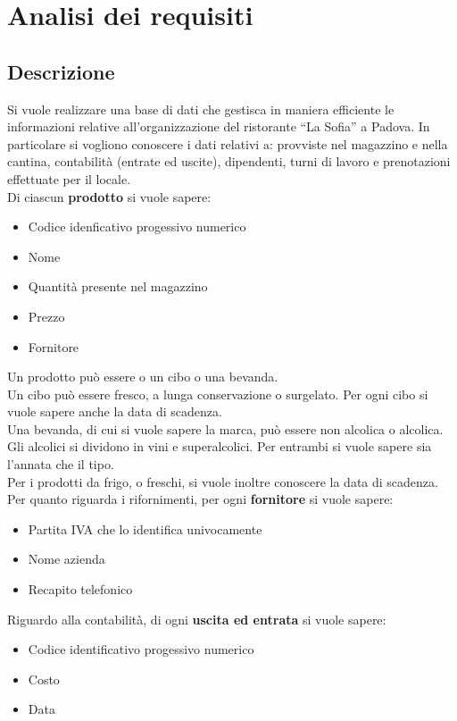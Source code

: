 \section{Analisi dei requisiti} 
\subsection{Descrizione}
Si vuole realizzare una base di dati che gestisca in maniera efficiente le informazioni relative all’organizzazione del ristorante “La Sofia” a Padova. \newline
In particolare si vogliono conoscere i dati relativi a: provviste nel magazzino e nella cantina, contabilità (entrate ed uscite), dipendenti, turni di lavoro e prenotazioni effettuate per il locale. \medskip \\
Di ciascun \textbf{prodotto} si vuole sapere:
\begin{itemize}
    \item Codice idenficativo progessivo numerico
    \item Nome
    \item Quantità presente nel magazzino
    \item Prezzo
    \item Fornitore
\end{itemize}
Un prodotto può essere o un cibo o una bevanda. \\
Un cibo può essere fresco, a lunga conservazione o surgelato. Per ogni cibo si vuole sapere anche la data di scadenza. \\
Una bevanda, di cui si vuole sapere la marca, può essere non alcolica o alcolica. Gli alcolici si dividono in vini e superalcolici. Per entrambi si vuole sapere sia l’annata che il tipo. \\
Per i prodotti da frigo, o freschi, si vuole inoltre conoscere la data di scadenza. \medskip \\
Per quanto riguarda i rifornimenti, per ogni \textbf{fornitore} si vuole sapere:
\begin{itemize}
    \item Partita IVA che lo identifica univocamente
    \item Nome azienda
    \item Recapito telefonico
\end{itemize}
Riguardo alla contabilità, di ogni \textbf{uscita ed entrata} si vuole sapere:
\begin{itemize}
    \item Codice identificativo progessivo numerico
    \item Costo %
    \item Data
\end{itemize}
